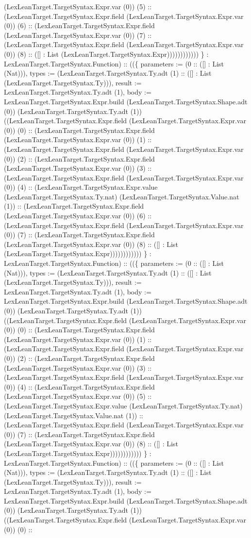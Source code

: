 \documentclass[11pt]{article}
\begin{document}
(LexLeanTarget.TargetSyntax.Expr.var (0)) (5) :: (LexLeanTarget.TargetSyntax.Expr.field (LexLeanTarget.TargetSyntax.Expr.var (0)) (6) :: (LexLeanTarget.TargetSyntax.Expr.field (LexLeanTarget.TargetSyntax.Expr.var (0)) (7) :: (LexLeanTarget.TargetSyntax.Expr.field (LexLeanTarget.TargetSyntax.Expr.var (0)) (8) :: ([] : List (LexLeanTarget.TargetSyntax.Expr)))))))))))) \} : LexLeanTarget.TargetSyntax.Function) :: ((\{ parameters := (0 :: ([] : List (Nat))), types := (LexLeanTarget.TargetSyntax.Ty.adt (1) :: ([] : List (LexLeanTarget.TargetSyntax.Ty))), result := LexLeanTarget.TargetSyntax.Ty.adt (1), body := LexLeanTarget.TargetSyntax.Expr.build (LexLeanTarget.TargetSyntax.Shape.adt (0)) (LexLeanTarget.TargetSyntax.Ty.adt (1)) ((LexLeanTarget.TargetSyntax.Expr.field (LexLeanTarget.TargetSyntax.Expr.var (0)) (0) :: (LexLeanTarget.TargetSyntax.Expr.field (LexLeanTarget.TargetSyntax.Expr.var (0)) (1) :: (LexLeanTarget.TargetSyntax.Expr.field (LexLeanTarget.TargetSyntax.Expr.var (0)) (2) :: (LexLeanTarget.TargetSyntax.Expr.field (LexLeanTarget.TargetSyntax.Expr.var (0)) (3) :: (LexLeanTarget.TargetSyntax.Expr.field (LexLeanTarget.TargetSyntax.Expr.var (0)) (4) :: (LexLeanTarget.TargetSyntax.Expr.value (LexLeanTarget.TargetSyntax.Ty.nat) (LexLeanTarget.TargetSyntax.Value.nat (1)) :: (LexLeanTarget.TargetSyntax.Expr.field (LexLeanTarget.TargetSyntax.Expr.var (0)) (6) :: (LexLeanTarget.TargetSyntax.Expr.field (LexLeanTarget.TargetSyntax.Expr.var (0)) (7) :: (LexLeanTarget.TargetSyntax.Expr.field (LexLeanTarget.TargetSyntax.Expr.var (0)) (8) :: ([] : List (LexLeanTarget.TargetSyntax.Expr)))))))))))) \} : LexLeanTarget.TargetSyntax.Function) :: ((\{ parameters := (0 :: ([] : List (Nat))), types := (LexLeanTarget.TargetSyntax.Ty.adt (1) :: ([] : List (LexLeanTarget.TargetSyntax.Ty))), result := LexLeanTarget.TargetSyntax.Ty.adt (1), body := LexLeanTarget.TargetSyntax.Expr.build (LexLeanTarget.TargetSyntax.Shape.adt (0)) (LexLeanTarget.TargetSyntax.Ty.adt (1)) ((LexLeanTarget.TargetSyntax.Expr.field (LexLeanTarget.TargetSyntax.Expr.var (0)) (0) :: (LexLeanTarget.TargetSyntax.Expr.field (LexLeanTarget.TargetSyntax.Expr.var (0)) (1) :: (LexLeanTarget.TargetSyntax.Expr.field (LexLeanTarget.TargetSyntax.Expr.var (0)) (2) :: (LexLeanTarget.TargetSyntax.Expr.field (LexLeanTarget.TargetSyntax.Expr.var (0)) (3) :: (LexLeanTarget.TargetSyntax.Expr.field (LexLeanTarget.TargetSyntax.Expr.var (0)) (4) :: (LexLeanTarget.TargetSyntax.Expr.field (LexLeanTarget.TargetSyntax.Expr.var (0)) (5) :: (LexLeanTarget.TargetSyntax.Expr.value (LexLeanTarget.TargetSyntax.Ty.nat) (LexLeanTarget.TargetSyntax.Value.nat (1)) :: (LexLeanTarget.TargetSyntax.Expr.field (LexLeanTarget.TargetSyntax.Expr.var (0)) (7) :: (LexLeanTarget.TargetSyntax.Expr.field (LexLeanTarget.TargetSyntax.Expr.var (0)) (8) :: ([] : List (LexLeanTarget.TargetSyntax.Expr)))))))))))) \} : LexLeanTarget.TargetSyntax.Function) :: ((\{ parameters := (0 :: ([] : List (Nat))), types := (LexLeanTarget.TargetSyntax.Ty.adt (1) :: ([] : List (LexLeanTarget.TargetSyntax.Ty))), result := LexLeanTarget.TargetSyntax.Ty.adt (1), body := LexLeanTarget.TargetSyntax.Expr.build (LexLeanTarget.TargetSyntax.Shape.adt (0)) (LexLeanTarget.TargetSyntax.Ty.adt (1)) ((LexLeanTarget.TargetSyntax.Expr.field (LexLeanTarget.TargetSyntax.Expr.var (0)) (0) :: 
\end{document}
